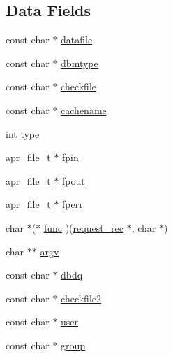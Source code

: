 \subsection*{Data Fields}
\begin{DoxyCompactItemize}
\item 
const char $\ast$ \hyperlink{structrewritemap__entry_a67a121174b6175e9df74f5f25973b3ae}{datafile}
\item 
const char $\ast$ \hyperlink{structrewritemap__entry_a471249b5ba7d3485cd641f450354c961}{dbmtype}
\item 
const char $\ast$ \hyperlink{structrewritemap__entry_ab92211b601ca827333ba84158804f147}{checkfile}
\item 
const char $\ast$ \hyperlink{structrewritemap__entry_a053032420dffa05a2bdc24955f2e1850}{cachename}
\item 
\hyperlink{pcre_8txt_a42dfa4ff673c82d8efe7144098fbc198}{int} \hyperlink{structrewritemap__entry_a9626591579ea6e130cb53fb60d9ae2df}{type}
\item 
\hyperlink{structapr__file__t}{apr\+\_\+file\+\_\+t} $\ast$ \hyperlink{structrewritemap__entry_a8e7e7b7acb409652d889f12b3bd8d766}{fpin}
\item 
\hyperlink{structapr__file__t}{apr\+\_\+file\+\_\+t} $\ast$ \hyperlink{structrewritemap__entry_a53da7dfad3a76b4258b9a12a88f9a5f0}{fpout}
\item 
\hyperlink{structapr__file__t}{apr\+\_\+file\+\_\+t} $\ast$ \hyperlink{structrewritemap__entry_ab179b38eca0c23a234fee1283bbcce84}{fperr}
\item 
char $\ast$($\ast$ \hyperlink{structrewritemap__entry_af06ea2757484e82f18c1cb43d9db01f1}{func} )(\hyperlink{structrequest__rec}{request\+\_\+rec} $\ast$, char $\ast$)
\item 
char $\ast$$\ast$ \hyperlink{structrewritemap__entry_a91ee34e5d514c770aa82ba799b23aa14}{argv}
\item 
const char $\ast$ \hyperlink{structrewritemap__entry_a9f58318adfc34f3ba5aaf35ac93f6c03}{dbdq}
\item 
const char $\ast$ \hyperlink{structrewritemap__entry_a772d607865ed9a804d10119add306b66}{checkfile2}
\item 
const char $\ast$ \hyperlink{structrewritemap__entry_a12d560276f740483daf38f8d1a172c76}{user}
\item 
const char $\ast$ \hyperlink{structrewritemap__entry_ae2de4c69f147571314aa947d5341e0a1}{group}
\end{DoxyCompactItemize}


